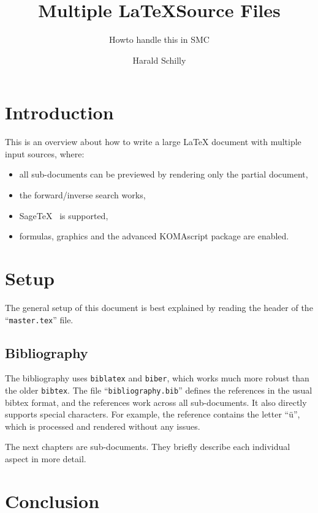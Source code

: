 \documentclass[12pt,
     DIV=12,
     twoside=false,
     twocolumn=false,
     abstraction,
     dottedtoc,
     headings=normal,
     headinclude=true,
     footinclude=true,
     parskip=half]{scrbook}
\title{Multiple \LaTeX Source Files}
\subtitle{Howto handle this in SMC}
\author{Harald Schilly}
\let\orgLaTeX\LaTeX
\renewcommand*{\LaTeX}{\orgLaTeX\xspace}
\begin{document}
\maketitle

\chapter{Introduction}

This is an overview about how to write a large \LaTeX document
with multiple input sources, where:

\begin{itemize}
\item all sub-documents can be previewed by rendering only the partial document,
\item the forward/inverse search works,
\item SageTeX~\cite{sagetex} is supported,
\item formulas, graphics and the advanced KOMAscript package are enabled.
\end{itemize}


\tableofcontents

\chapter{Setup}

The general setup of this document is best explained by reading the header
of the ``\texttt{master.tex}'' file.

\section{Bibliography}

The bibliography uses \texttt{biblatex} and \texttt{biber},
which works much more robust than the older \texttt{bibtex}.
The file ``\texttt{bibliography.bib}'' defines the references
in the usual bibtex format,
and the references work across all sub-documents.
It also directly supports special characters. For example, the \cite{komascript} reference contains the letter ``ü'',
which is processed and rendered without any issues.

The next chapters are sub-documents.
They briefly describe each individual aspect in more detail.






\chapter{Conclusion}

\printbibliography
\end{document}
